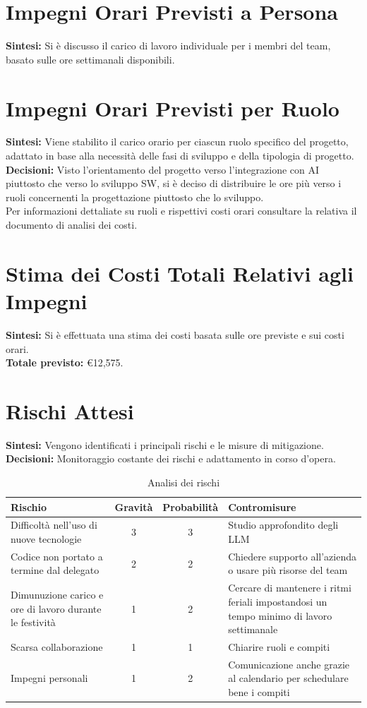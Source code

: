 \documentclass{article}
\begin{document}
\section{Impegni Orari Previsti a Persona}
\textbf{Sintesi:} Si è discusso il carico di lavoro individuale per i membri del team, basato sulle ore settimanali disponibili.

\section{Impegni Orari Previsti per Ruolo}
\textbf{Sintesi:} Viene stabilito il carico orario per ciascun ruolo specifico del progetto, adattato in base alla necessità delle fasi di sviluppo e della tipologia di progetto. \\
\textbf{Decisioni:} Visto l'orientamento del progetto verso l'integrazione con AI piuttosto che verso lo sviluppo SW, si è deciso di distribuire le ore più verso i ruoli concernenti la progettazione piuttosto che lo sviluppo.\\Per informazioni dettaliate su ruoli e rispettivi costi orari consultare la relativa il documento di analisi dei costi.

\section{Stima dei Costi Totali Relativi agli Impegni}
\textbf{Sintesi:} Si è effettuata una stima dei costi basata sulle ore previste e sui costi orari. \\
\textbf{Totale previsto:} €12,575. 

\section{Rischi Attesi}
\textbf{Sintesi:} Vengono identificati i principali rischi e le misure di mitigazione.
\textbf{Decisioni:} Monitoraggio costante dei rischi e adattamento in corso d’opera.

\begin{table}[h]
\centering
\begin{tabularx}{\textwidth}{|X|c|c|X|}
    \hline
    \textbf{Rischio} & \textbf{Gravità} & \textbf{Probabilità}& \textbf{Contromisure}\\
    \hline
    Difficoltà nell'uso di nuove tecnologie & 3& 3 & Studio approfondito degli LLM \\ 
    \hline
    Codice non portato a termine dal delegato & 2 & 2 & Chiedere supporto all'azienda o usare più risorse del team\\ 
    \hline
    Dimunuzione carico e ore di lavoro durante le festività & 1 & 2 & Cercare di mantenere i ritmi feriali impostandosi un tempo minimo di lavoro settimanale\\ 
    \hline 
    Scarsa collaborazione & 1& 1 & Chiarire ruoli e compiti \\ 
    \hline
    Impegni personali & 1 & 2 & Comunicazione anche grazie al calendario per schedulare bene i compiti\\ 
    \hline 
\end{tabularx}
\caption{Analisi dei rischi}
\end{table}
\end{document}

